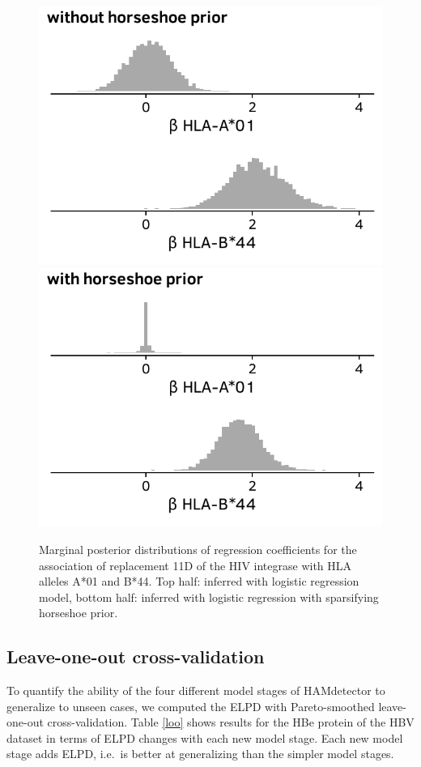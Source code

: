 \documentclass{bioinfo}
\begin{document}
\begin{figure}
  \centering
  \includegraphics[width=0.8\linewidth]{plots/without_horseshoe.pdf}
  \includegraphics[width=0.8\linewidth]{plots/with_horseshoe.pdf}
  \caption{Marginal posterior distributions of regression coefficients for the association of replacement 11D of the HIV integrase with HLA alleles A*01 and B*44. Top half: inferred with logistic regression model, bottom half: inferred with logistic regression with sparsifying horseshoe prior.}
  \label{fig:horseshoe-comparison}
\end{figure}


\subsection{Leave-one-out cross-validation}

To quantify the ability of the four different model stages of HAMdetector to generalize to unseen cases, we computed the ELPD with Pareto-smoothed leave-one-out cross-validation. Table \ref{loo} shows results for the HBe protein of the HBV dataset in terms of ELPD changes with each new model stage. Each new model stage adds ELPD, i.e.\ is better at generalizing than the simpler model stages.
\end{document}
